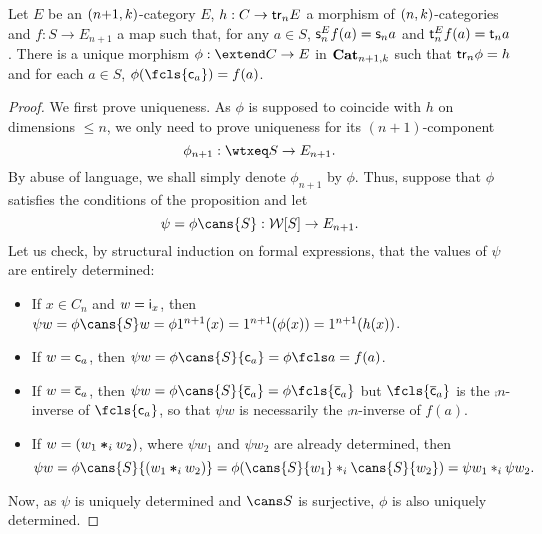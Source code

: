 \begin{proposition}\label{prop:univprop}
   Let $E$ be an  $(n{+}1,k)$-category $E$, $h:C\to\mathsf{tr}_{n} E$ a
   morphism of $(n,k)$-categories
   and  $f:S\to E_{n+1}$ a map such that, for any $a\in S$, $\mathsf{s}_{n}^Ef(a)=\mathsf{s}_{n} a$
    and $\mathsf{t}_{n}^E f(a)=\mathsf{t}_{n} a$.  There is a unique
    morphism $\phi:\extend C\to E$ in $\mathbf{Cat}_{n+1,k}$ such that $\mathsf{tr}_{n}\phi=h$ and for each $a\in S$, $\phi(\fcls{\fcst a})=f(a)$.
  \end{proposition}
  \begin{proof}
We first prove uniqueness. As $\phi$ is supposed to coincide with $h$ on
dimensions $\leq n$, we only need to prove uniqueness for its
$(n{+}1)$-component
\[\phi_{n+1}:\wtxeq S\to E_{n+1}.\]
By abuse of
language, we shall simply denote $\phi_{n+1}$ by $\phi$. Thus, suppose
that $\phi$ satisfies the conditions of the proposition and let
\[\psi=\phi \cans{S}:\wtx S\to E_{n+1}.\]
   Let us check,
   by structural induction on formal expressions, that the values of
   $\psi$ are entirely determined:
   \begin{itemize}
   \item If $x\in C_n$ and $w=\mathsf{i}_{x}$, then $\psi w=\phi\cans{S}
     w=\phi\unit{n+1}(x)=\unit{n+1}(\phi(x))=\unit{n+1}(h(x))$.
   \item If $w=\mathsf{c}_{a}$, then $\psi
     w=\phi\cans{S}{\fcst{a}}=\phi\fcls a=f(a)$.
   \item If $w=\overline{\mathsf{c}}_{a}$, then $\psi w=\phi\cans{S}{\finv a}=\phi\fcls{\finv
       a}$ but $\fcls{\finv a}$ is the $\comp n$-inverse of
     $\fcls{\fcst a}$, so that $\psi w$ is necessarily the $\comp
     n$-inverse of $f(a)$.
   \item If $w=(w_1\bm{\ast}_{i} w_2)$, where $\psi w_1$ and $\psi w_2$ are
     already determined, then
     \[\psi w=\phi\cans{S}{(w_1\fcomp i w_2)}=\phi(\cans{S}{ w_1}\comp i \cans{S}
      { w_2})=\psi w_1\comp i \psi w_2.\]
  \end{itemize}
  Now, as $\psi$ is uniquely determined and $\cans S$  is surjective,
  $\phi$ is also uniquely determined.


\end{proof}
